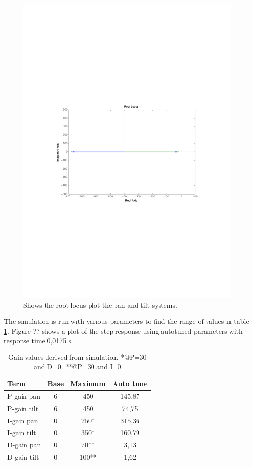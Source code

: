 \begin{figure}[htb]
	\centering
	\includegraphics[width=\textwidth,clip,trim=60 270 60 270]{graphics/rlocus_plot.pdf} %
	\caption{Shows the root locus plot the pan and tilt systems.}
	\label{fig:rlocus_plot}			
\end{figure}

The simulation is run with various parameters to find the range of values in table \ref{tab:gain_values}. Figure ?? shows a plot of the step response using autotuned parameters with response time 0,0175 s.

\begin{table}[htb]				
	\centering
	\begin{tabular}{lccc}			
	Term & Base & Maximum & Auto tune \\			
	\midrule												
P-gain pan& 6 & 450 & 145,87\\
P-gain tilt& 6 & 450 & 74,75 \\
I-gain pan& 0 & 250* & 315,36  \\
I-gain tilt& 0 & 350* & 160,79 \\
D-gain pan& 0 & 70** & 3,13 \\
D-gain tilt& 0 & 100** & 1,62\\
	\end{tabular}
	\caption{Gain values derived from simulation. *@P=30 and D=0. **@P=30 and I=0}				
	\label{tab:gain_values}			
\end{table}

